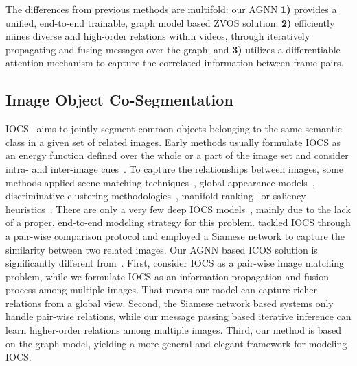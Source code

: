 \documentclass[10pt,twocolumn,letterpaper]{article}
\begin{document}
The differences from previous methods are multifold: our AGNN \textbf{1)} provides a unified, end-to-end trainable, graph model based ZVOS solution; \textbf{2)} efficiently mines diverse and high-order relations within videos, through iteratively propagating and fusing messages over the graph; and \textbf{3)} utilizes a differentiable attention mechanism to capture the correlated information between frame pairs.
\vspace*{-3pt}
\subsection{Image Object Co-Segmentation}
	\vspace*{-2pt}	
\label{sec:coseg}
IOCS~\cite{rother2006cosegmentation,Mukherjee2009,Hochbaum2009} aims to jointly segment common objects belonging to the same semantic class in a given set of related images. Early methods usually formulate IOCS as an energy function defined over the whole or a part of the image set and consider intra- and inter-image cues~\cite{Vicente2010CosegmentationRM,Kim2011,Rubio2012,vicente2011object}.
To capture the relationships between images, some methods applied scene matching techniques~\cite{Rubinstein_2013_CVPR}, global appearance models~\cite{wang2016higher}, discriminative clustering methodologies~\cite{joulin2010discriminative}, manifold ranking~\cite{quan2016object}  or saliency heuristics~\cite{han2018,tao2017image}.
There are only a very few deep IOCS models~\cite{chen2018semantic,DBLP:journals/corr/abs-1804-06423}, mainly due to the lack of a proper, end-to-end modeling strategy for this problem.  \cite{chen2018semantic,DBLP:journals/corr/abs-1804-06423} tackled IOCS through a pair-wise comparison protocol and employed a Siamese network to capture the similarity between two related images.
Our AGNN based ICOS solution is significantly different from~\cite{chen2018semantic,DBLP:journals/corr/abs-1804-06423}. First, \cite{chen2018semantic,DBLP:journals/corr/abs-1804-06423} consider IOCS as a pair-wise image matching problem, while we formulate IOCS as an information propagation and fusion process among multiple images. That means our model can capture richer relations from a global view. Second, the Siamese network based systems only handle pair-wise relations, while our message passing based iterative inference can learn higher-order relations among multiple images. Third, our method is based on the graph model, yielding a more general and elegant framework for modeling IOCS.
\end{document}
